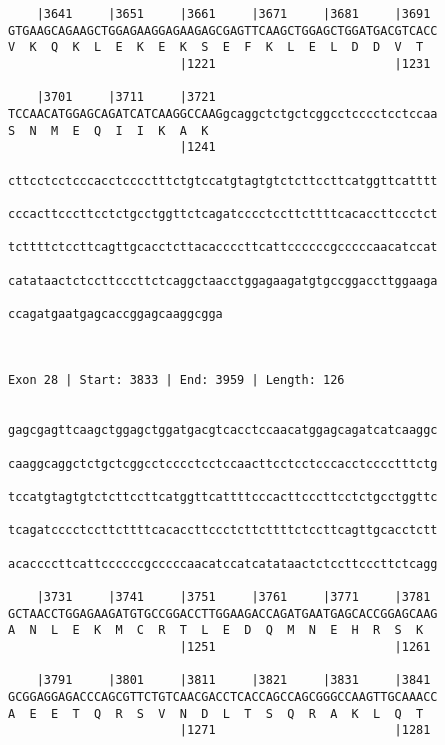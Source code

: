 \documentclass{article}
\begin{document}
\begin{Verbatim}
    |3641     |3651     |3661     |3671     |3681     |3691 
GTGAAGCAGAAGCTGGAGAAGGAGAAGAGCGAGTTCAAGCTGGAGCTGGATGACGTCACC
V  K  Q  K  L  E  K  E  K  S  E  F  K  L  E  L  D  D  V  T  
                        |1221                         |1231 
  
    |3701     |3711     |3721                               
TCCAACATGGAGCAGATCATCAAGGCCAAGgcaggctctgctcggcctcccctcctccaa
S  N  M  E  Q  I  I  K  A  K                                
                        |1241                               
  
cttcctcctcccacctcccctttctgtccatgtagtgtctcttccttcatggttcatttt
                                                            
cccacttcccttcctctgcctggttctcagatcccctccttcttttcacaccttccctct
                                                            
tcttttctccttcagttgcacctcttacaccccttcattccccccgcccccaacatccat
                                                            
catataactctccttcccttctcaggctaacctggagaagatgtgccggaccttggaaga
                                                            
ccagatgaatgagcaccggagcaaggcgga
                              
                              
 
Exon 28 | Start: 3833 | End: 3959 | Length: 126


gagcgagttcaagctggagctggatgacgtcacctccaacatggagcagatcatcaaggc
                                                            
caaggcaggctctgctcggcctcccctcctccaacttcctcctcccacctcccctttctg
                                                            
tccatgtagtgtctcttccttcatggttcattttcccacttcccttcctctgcctggttc
                                                            
tcagatcccctccttcttttcacaccttccctcttcttttctccttcagttgcacctctt
                                                            
acaccccttcattccccccgcccccaacatccatcatataactctccttcccttctcagg
                                                            
    |3731     |3741     |3751     |3761     |3771     |3781 
GCTAACCTGGAGAAGATGTGCCGGACCTTGGAAGACCAGATGAATGAGCACCGGAGCAAG
A  N  L  E  K  M  C  R  T  L  E  D  Q  M  N  E  H  R  S  K  
                        |1251                         |1261 
  
    |3791     |3801     |3811     |3821     |3831     |3841 
GCGGAGGAGACCCAGCGTTCTGTCAACGACCTCACCAGCCAGCGGGCCAAGTTGCAAACC
A  E  E  T  Q  R  S  V  N  D  L  T  S  Q  R  A  K  L  Q  T  
                        |1271                         |1281 
  

\end{Verbatim}
\end{document}
